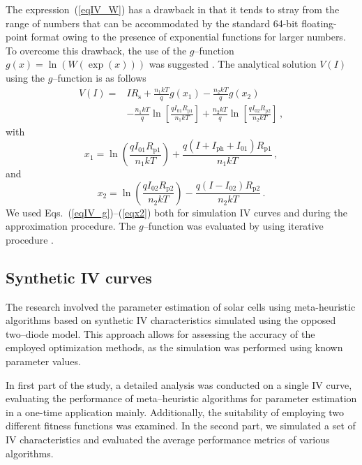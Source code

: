 \documentclass[a4paper,fleqn]{cas-dc}
\begin{document}
The expression~(\ref{eqIV_W}) has a drawback in that it tends to stray from the range of numbers that can be accommodated by the standard 64-bit floating-point format owing to the presence of exponential functions for larger numbers.
To overcome this drawback, the use of the $g$--function $g(x)=\ln(W(\exp(x)))$ was suggested \cite{roberts2015calculating}.
The analytical solution $V(I)$ using the $g$--function is as follows \cite{roberts2015calculating}
\begin{equation}
\label{eqIV_g}
\begin{split}
V(I)= &IR_\mathrm{s}+\frac{n_1kT}{q}g(x_1)-\frac{n_2kT}{q}g(x_2) \\
  &-\frac{n_1kT}{q}\ln\left[\frac{qI_{01}R_\mathrm{p1}}{n_1kT}\right] +\frac{n_2kT}{q}\ln\left[\frac{qI_{02}R_\mathrm{p2}}{n_2kT}\right]\,,
\end{split}
\end{equation}
with
\begin{equation}
\label{eqx1}
x_1= \ln\left(\frac{qI_{01}R_\mathrm{p1}}{n_1kT}\right)+\frac{q(I+I_\mathrm{ph}+I_{01})R_\mathrm{p1}}{n_1kT}\,,
\end{equation}
and
\begin{equation}
\label{eqx2}
x_2= \ln\left(\frac{qI_{02}R_\mathrm{p2}}{n_2kT}\right)-\frac{q(I-I_{02})R_\mathrm{p2}}{n_2kT}\,.
\end{equation}
We used Eqs.~(\ref{eqIV_g})--(\ref{eqx2}) both for simulation IV curves and during the approximation procedure.
The $g$--function was evaluated by using iterative procedure \cite{roberts2015calculating}.

\subsection{Synthetic IV curves}\label{SynIV}
The research involved the parameter estimation of solar cells using meta-heuristic algorithms based
on synthetic IV characteristics simulated using the opposed two--diode model.
This approach allows for assessing the accuracy of the employed optimization methods,
as the simulation was performed using known parameter values.

In first part of the study, a detailed analysis was conducted on a single IV curve,
evaluating the performance of meta--heuristic algorithms for parameter estimation in a one-time application mainly.
Additionally, the suitability of employing two different fitness functions was examined.
In the second part, we simulated a set of IV characteristics and evaluated the average performance metrics of various algorithms.
\end{document}
